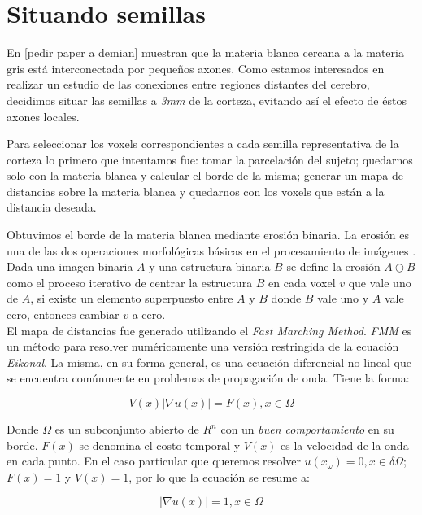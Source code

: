 \section{Situando semillas}

En [pedir paper a demian] muestran que la materia blanca cercana a la materia gris 
est\'a interconectada por peque\~nos axones. Como estamos interesados en realizar
un estudio de las conexiones entre regiones distantes del cerebro, decidimos
situar las semillas a \textit{3mm} de la corteza, evitando as\'i el efecto de
\'estos axones locales. 

Para seleccionar los voxels correspondientes a cada semilla representativa de la
corteza lo primero que intentamos fue: tomar la parcelaci\'on del sujeto; 
quedarnos solo con la materia blanca y calcular el borde de la misma; generar un
mapa de distancias sobre la materia blanca y quedarnos con los voxels que est\'an
a la distancia deseada. 

Obtuvimos el borde de la materia blanca mediante erosi\'on binaria. La erosi\'on
es una de las dos operaciones morfol\'ogicas b\'asicas en el procesamiento de
im\'agenes \cite{Serra1983}. Dada una imagen binaria $A$ y una estructura binaria
$B$ se define la erosi\'on $ A \ominus B $ como el proceso iterativo de centrar
la estructura $B$ en cada voxel $v$ que vale uno de $A$, si existe un elemento
superpuesto entre $A$ y $B$ donde $B$ vale uno y $A$ vale cero, entonces cambiar
$v$ a cero. \\


El mapa de distancias fue generado utilizando el \textit{Fast Marching Method}. 
\textit{FMM} es un m\'etodo para resolver num\'ericamente una versi\'on 
restringida de la ecuaci\'on \textit{Eikonal}. La misma, en su forma general, es
una ecuaci\'on diferencial no lineal que se encuentra com\'unmente en problemas de
propagaci\'on de onda. Tiene la forma: 

$$ V(x) | \nabla u(x) | = F(x) , x \in \Omega $$ 

Donde $\Omega$ es un subconjunto abierto de $R^n$ con un
\textit{buen comportamiento} en su borde. $F(x)$ se denomina el costo temporal y
$V(x)$ es la velocidad de la onda en cada punto. En el caso particular que
queremos resolver $u(x_\omega) = 0, x \in \delta\Omega$;  $F(x)=1$ y $V(x)=1$,
por lo que la ecuaci\'on se resume a:

$$ | \nabla u(x) | = 1 , x \in \Omega $$ 

